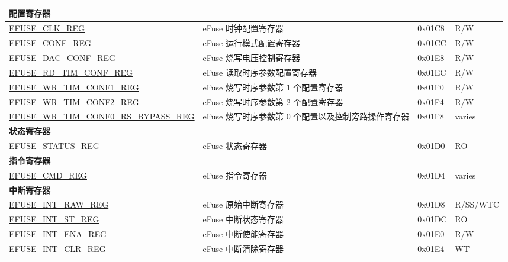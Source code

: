 \begin{longtable}{ | p{6.8cm} | p{7cm} | p{1.3cm} | p{1.2cm} | }
    \multicolumn{4}{|l|}{\textbf{配置寄存器}} \\ \hline
    \hyperref[regdesc:EFUSECLKREG]{EFUSE\_CLK\_REG} & eFuse 时钟配置寄存器 & 0x01C8 & R/W \\ \hline
    \hyperref[regdesc:EFUSECONFREG]{EFUSE\_CONF\_REG} & eFuse 运行模式配置寄存器 & 0x01CC & R/W \\ \hline
    \hyperref[regdesc:EFUSEDACCONFREG]{EFUSE\_DAC\_CONF\_REG} & eFuse 烧写电压控制寄存器 & 0x01E8 & R/W \\ \hline
    \hyperref[regdesc:EFUSERDTIMCONFREG]{EFUSE\_RD\_TIM\_CONF\_REG} & eFuse 读取时序参数配置寄存器 & 0x01EC & R/W \\ \hline
    \hyperref[regdesc:EFUSEWRTIMCONF1REG]{EFUSE\_WR\_TIM\_CONF1\_REG} & eFuse 烧写时序参数第 1 个配置寄存器 & 0x01F0 & R/W \\ \hline
    \hyperref[regdesc:EFUSEWRTIMCONF2REG]{EFUSE\_WR\_TIM\_CONF2\_REG} & eFuse 烧写时序参数第 2 个配置寄存器 & 0x01F4 & R/W \\ \hline
    \hyperref[regdesc:EFUSEWRTIMCONF0RSBYPASSREG]{EFUSE\_WR\_TIM\_CONF0\_RS\_BYPASS\_REG} & eFuse 烧写时序参数第 0 个配置以及控制旁路操作寄存器 & 0x01F8 & varies \\ \hline
    \multicolumn{4}{|l|}{\textbf{状态寄存器}} \\ \hline
    \hyperref[regdesc:EFUSESTATUSREG]{EFUSE\_STATUS\_REG} & eFuse 状态寄存器 & 0x01D0 & RO \\ \hline
    \multicolumn{4}{|l|}{\textbf{指令寄存器}} \\ \hline
    \hyperref[regdesc:EFUSECMDREG]{EFUSE\_CMD\_REG} & eFuse 指令寄存器 & 0x01D4 & varies \\ \hline
    \multicolumn{4}{|l|}{\textbf{中断寄存器}} \\ \hline
    \hyperref[regdesc:EFUSEINTRAWREG]{EFUSE\_INT\_RAW\_REG} & eFuse 原始中断寄存器 & 0x01D8 & R/SS/WTC \\ \hline
    \hyperref[regdesc:EFUSEINTSTREG]{EFUSE\_INT\_ST\_REG} & eFuse 中断状态寄存器 & 0x01DC & RO \\ \hline
    \hyperref[regdesc:EFUSEINTENAREG]{EFUSE\_INT\_ENA\_REG} & eFuse 中断使能寄存器 & 0x01E0 & R/W \\ \hline
    \hyperref[regdesc:EFUSEINTCLRREG]{EFUSE\_INT\_CLR\_REG} & eFuse 中断清除寄存器 & 0x01E4 & WT \\ \hline
    \end{longtable}
